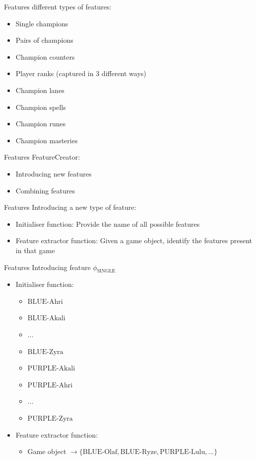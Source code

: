 \begin{frame}{Features}
 different types of features:\\
\begin{itemize}
\item Single champions
\item Pairs of champions
\item Champion counters
\item Player ranks (captured in 3 different ways)
\item Champion lanes
\item Champion spells
\item Champion runes
\item Champion masteries
\end{itemize}
\end{frame}


\begin{frame}{Features}
\centering
FeatureCreator:
\begin{itemize}
\item Introducing new features
\item Combining features
\end{itemize}
\end{frame}

\begin{frame}{Features}
Introducing a new type of feature:
\begin{itemize}
\item Initialiser function: Provide the name of all possible features
\item Feature extractor function: Given a game object, identify the features present in that game
\end{itemize}
\end{frame}

\begin{frame}{Features}
Introducing feature $\phi_\text{SINGLE}$
\begin{itemize}
\item Initialiser function: 
	\begin{itemize}
	\item $\text{BLUE-Ahri}$
	\item $\text{BLUE-Akali}$
	\item ...
	\item $\text{BLUE-Zyra}$
	\item $\text{PURPLE-Akali}$
	\item $\text{PURPLE-Ahri}$
	\item ...
	\item $\text{PURPLE-Zyra}$
	\end{itemize}
\item Feature extractor function:  
	\begin{itemize}
	\item Game object $\rightarrow \{\text{BLUE-Olaf}, \text{BLUE-Ryze}, \text{PURPLE-Lulu}, ...\}$
	\end{itemize}
\end{itemize}
\end{frame}

